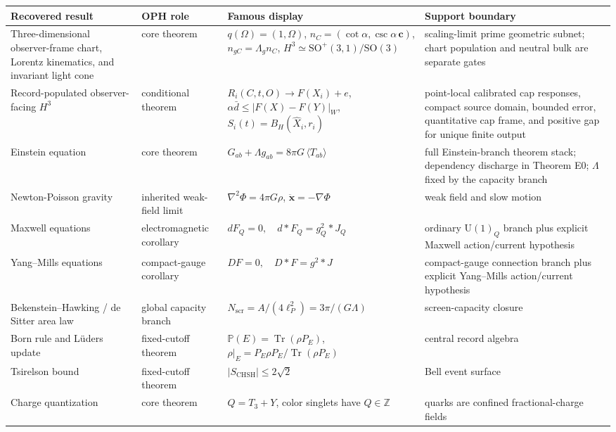 \documentclass[11pt]{article}
\begin{document}
\begingroup
\footnotesize
\begin{longtable}{@{}>{\raggedright\arraybackslash}p{}>{\raggedright\arraybackslash}p{}>{\raggedright\arraybackslash}p{}>{\raggedright\arraybackslash}p{}@{}}
\toprule
Recovered result & OPH role & Famous display & Support boundary \\
\midrule
\endhead
\bottomrule
\endfoot
Three-dimensional observer-frame chart, Lorentz kinematics, and invariant light cone & core theorem & \(q(\Omega)=(1,\Omega)\), \(n_C=(\cot\alpha,\csc\alpha\,\mathbf c)\), \(n_{gC}=\Lambda_gn_C\), \(H^3\simeq\mathrm{SO}^+(3,1)/\mathrm{SO}(3)\) & scaling-limit prime geometric subnet; chart population and neutral bulk are separate gates \\
Record-populated observer-facing \(H^3\) & conditional theorem & \(R_i(C,t,O)\to F(X_i)+e\), \(\alpha\bar d\le |F(X)-F(Y)|_W\), \(S_i(t)=B_H(\widehat X_i,r_i)\) & point-local calibrated cap responses, compact source domain, bounded error, quantitative cap frame, and positive gap for unique finite output \\
Einstein equation & core theorem & \(G_{ab}+\Lambda g_{ab}=8\pi G\,\langle T_{ab}\rangle\) & full Einstein-branch theorem stack; dependency discharge in Theorem E0; \(\Lambda\) fixed by the capacity branch \\
Newton-Poisson gravity & inherited weak-field limit & \(\nabla^2\Phi=4\pi G\rho\), \(\ddot{\mathbf x}=-\nabla\Phi\) & weak field and slow motion \\
Maxwell equations & electromagnetic corollary & \(dF_Q=0,\quad d{*}F_Q=g_Q^2{*}J_Q\) & ordinary \(\mathrm U(1)_Q\) branch plus explicit Maxwell action/current hypothesis \\
Yang--Mills equations & compact-gauge corollary & \(DF=0,\quad D{*}F=g^2{*}J\) & compact-gauge connection branch plus explicit Yang--Mills action/current hypothesis \\
Bekenstein--Hawking / de Sitter area law & global capacity branch & \(N_{\mathrm{scr}}=A/(4\ell_P^2)=3\pi/(G\Lambda)\) & screen-capacity closure \\
Born rule and L\"uders update & fixed-cutoff theorem & \(\mathbb P(E)=\operatorname{Tr}(\rho P_E)\), \(\rho|_E=P_E\rho P_E/\operatorname{Tr}(\rho P_E)\) & central record algebra \\
Tsirelson bound & fixed-cutoff theorem & \(|S_{\mathrm{CHSH}}|\le2\sqrt2\) & Bell event surface \\
Charge quantization & core theorem & \(Q=T_3+Y\), color singlets have \(Q\in\mathbb Z\) & quarks are confined fractional-charge fields \\

\end{longtable}
\end{document}
